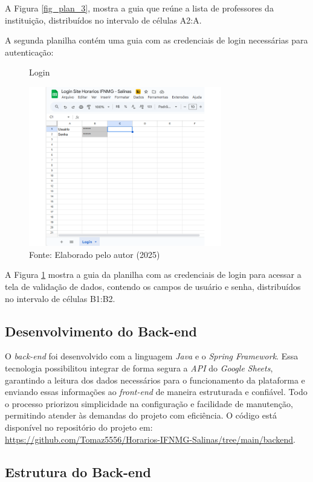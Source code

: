 A Figura \ref{fig_plan_3}, mostra a guia que reúne a lista de professores da instituição, distribuídos no intervalo de células A2:A.

A segunda planilha contém uma guia com as credenciais de login necessárias para autenticação:

\begin{figure}[htb]
    \centering
    \caption{Login}
    \includegraphics[width=0.75\textwidth]{Figuras/plan-4.png}
    \caption*{Fonte: Elaborado pelo autor (2025)}
    \label{fig_plan_4}
\end{figure}

A Figura \ref{fig_plan_4} mostra a guia da planilha com as credenciais de login para acessar a tela de validação de dados, contendo os campos de usuário e senha, distribuídos no intervalo de células B1:B2.

\subsection{Desenvolvimento do Back-end}

O \textit{back-end} foi desenvolvido com a linguagem \textit{Java} e o \textit{Spring Framework}. Essa tecnologia possibilitou integrar de forma segura a \textit{API} do \textit{Google Sheets}, garantindo a leitura dos dados necessários para o funcionamento da plataforma e enviando essas informações ao \textit{front-end} de maneira estruturada e confiável. Todo o processo priorizou simplicidade na configuração e facilidade de manutenção, permitindo atender às demandas do projeto com eficiência. O código está disponível no repositório do projeto em: \url{https://github.com/Tomaz5556/Horarios-IFNMG-Salinas/tree/main/backend}.

\subsection{Estrutura do Back-end}

